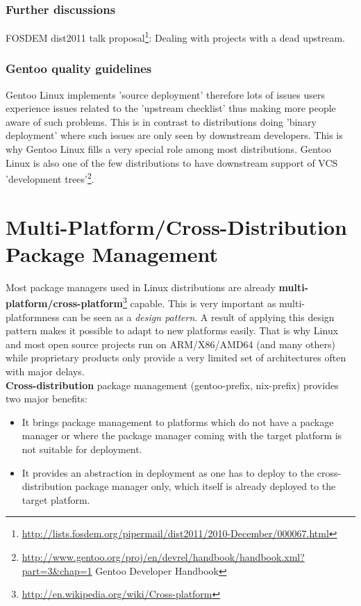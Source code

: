 \documentclass[a4paper,10pt]{article}
\begin{document}
\subsubsection*{Further discussions}
FOSDEM dist2011 talk proposal\footnote{\url{http://lists.fosdem.org/pipermail/dist2011/2010-December/000067.html}}: Dealing with projects with a dead upstream.

\subsubsection*{Gentoo quality guidelines}
Gentoo Linux implements 'source deployment' therefore lots of issues users experience issues related to the 'upstream checklist' thus making more people aware of such problems. This is in contrast to distributions doing 'binary deployment' where such issues are only seen by downstream developers. This is why Gentoo Linux fills a very special role among most distributions. Gentoo Linux is also one of the few distributions to have downstream support of VCS 'development trees'\footnote{\url{http://www.gentoo.org/proj/en/devrel/handbook/handbook.xml?part=3&chap=1}
Gentoo Developer Handbook}.









\newpage
\section{Multi-Platform/Cross-Distribution Package Management}
\label{CrossPlatformCrossDistributionPackageManagement}
Most package managers used in Linux distributions are already \textbf{multi-platform/cross-platform}\footnote{\url{http://en.wikipedia.org/wiki/Cross-platform}} capable. This is very important as multi-platformness can be seen as a \textit{design pattern}. A result of applying this design pattern makes it possible to adapt to new platforms easily. That is why Linux and most open source projects run on ARM/X86/AMD64 (and many others) while proprietary products only provide a very limited set of architectures often with major delays.\\

\textbf{Cross-distribution} package management (gentoo-prefix, nix-prefix) provides two major benefits:
\begin{itemize}
\item It brings package management to platforms which do not have a package manager or where the package manager coming with the target platform is not suitable for deployment.
\item It provides an abstraction in deployment as one has to deploy to the cross-distribution package manager only, which itself is already deployed to the target platform.
\end{itemize}
\end{document}
